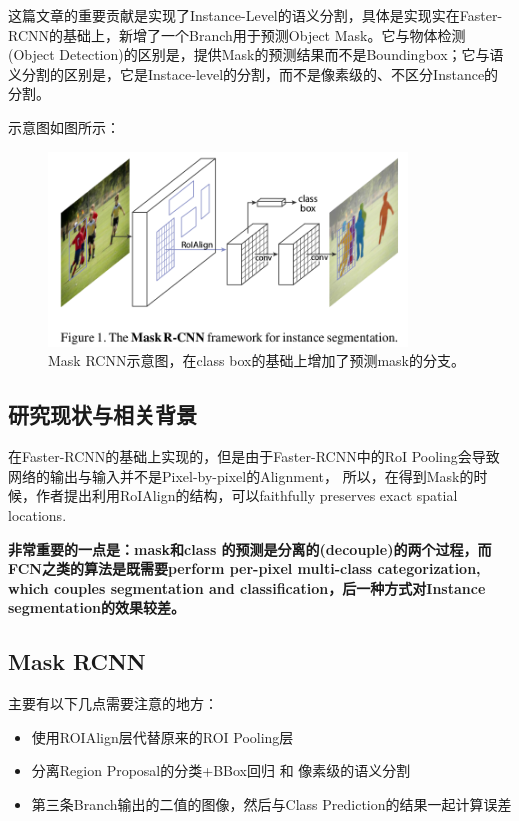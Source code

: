 这篇文章的重要贡献是实现了Instance-Level的语义分割，具体是实现实在Faster-RCNN的基础上，新增了一个Branch用于预测Object Mask。它与物体检测(Object Detection)的区别是，提供Mask的预测结果而不是Boundingbox；它与语义分割的区别是，它是Instace-level的分割，而不是像素级的、不区分Instance的分割。

示意图如图所示：
\begin{figure}[!hbtp]
\centering
\includegraphics[width=0.85\textwidth]{SemanticSLAM/MaskRCNN0.png}
\caption{Mask RCNN示意图，在class box的基础上增加了预测mask的分支。}
\label{MaskRCNN0}
\end{figure}

\subsection{研究现状与相关背景}

在Faster-RCNN的基础上实现的，但是由于Faster-RCNN中的RoI Pooling会导致网络的输出与输入并不是Pixel-by-pixel的Alignment， 所以，在得到Mask的时候，作者提出利用RoIAlign的结构，可以faithfully preserves exact spatial locations.

{\bfseries 非常重要的一点是：mask和class 的预测是分离的(decouple)的两个过程，而FCN之类的算法是既需要perform per-pixel multi-class categorization, which couples segmentation and classification，后一种方式对Instance segmentation的效果较差。}


\subsection{Mask RCNN}

主要有以下几点需要注意的地方：
\begin{itemize}
\item 使用ROIAlign层代替原来的ROI Pooling层
\item 分离Region Proposal的分类+BBox回归 和 像素级的语义分割
\item 第三条Branch输出的二值的图像，然后与Class Prediction的结果一起计算误差
\end{itemize}

